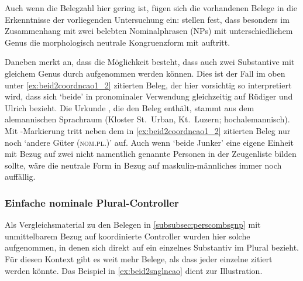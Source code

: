 Auch wenn die Belegzahl hier gering ist, fügen sich die vorhandenen Belege in
die Erkenntnisse der vorliegenden Untersuchung ein:
\textcites[39--40]{behaghel1928}[118]{dal2014} stellen fest, dass besonders im
Zusammenhang mit zwei belebten Nominalphrasen (NPs) mit unterschiedlichem Genus
die morphologisch neutrale Kongruenzform mit  auftritt.

\label{phsec:jungherren}
Daneben merkt \textcite[384]{paul2007} an, dass die Möglichkeit besteht, dass
auch zwei Substantive mit gleichem Genus durch
 aufgenommen werden können. Dies ist der Fall im oben unter
\cref{ex:beid2coordncao1_2} zitierten Beleg, der hier vorsichtig so
interpretiert wird, dass sich  `beide' in pronominaler Verwendung
gleichzeitig auf Rüdiger und Ulrich bezieht. Die Urkunde \citet[2915]{cao4},
die den Beleg enthält, stammt aus dem alemannischen Sprachraum (Kloster
St.~Urban, Kt.~Luzern; hochalemannisch). Mit
-Markierung tritt neben dem in \cref{ex:beid2coordncao1_2} zitierten
Beleg nur noch  `andere Güter (\textsc{nom.pl.\NeutI})'
\autocite[\pno~2915, 213.27]{cao4} auf. Auch wenn 
`beide Junker' eine eigene Einheit mit Bezug auf zwei nicht namentlich
genannte Personen in der Zeugenliste bilden sollte, wäre die neutrale Form
 in Bezug auf maskulin-männliches  immer noch
auffällig.

\subsubsection{Einfache nominale Plural-Controller}
\label{subsubsec:persplnp}

Als Vergleichsmaterial zu den Belegen in \cref{subsubsec:perscombsgnp} mit
unmittelbarem Bezug auf koordinierte Controller wurden hier solche
aufgenommen, in denen sich  direkt auf ein einzelnes Substantiv im
Plural bezieht. Für diesen Kontext gibt es weit mehr Belege, als dass jeder
einzelne zitiert werden könnte. Das Beispiel in \cref{ex:beid2snglncao} dient
zur Illustration.

